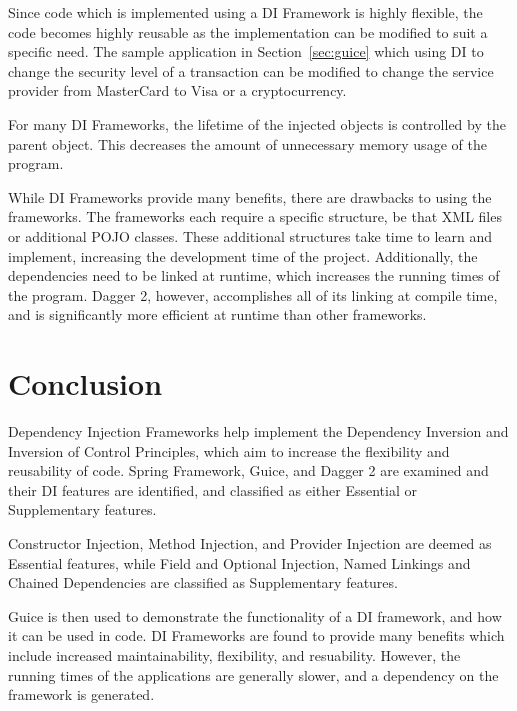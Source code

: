\documentclass[12pt,twocolumn]{IEEEtran}
\begin{document}
Since code which is implemented using a DI Framework is highly flexible, the code becomes highly reusable as the implementation can be modified to suit a specific need. The sample application in Section~\ref{sec:guice} which using DI to change the security level of a transaction can be modified to change the service provider from MasterCard to Visa or a cryptocurrency. 

For many DI Frameworks, the lifetime of the injected objects is controlled by the parent object. This decreases the amount of unnecessary memory usage of the program.

While DI Frameworks provide many benefits, there are drawbacks to using the frameworks. The frameworks each require a specific structure, be that XML files or additional POJO classes. These additional structures take time to learn and implement, increasing the development time of the project. Additionally, the dependencies need to be linked at runtime, which increases the running times of the program. Dagger 2, however, accomplishes all of its linking at compile time, and is significantly more efficient at runtime than other frameworks.


\section{Conclusion}

Dependency Injection Frameworks help implement the Dependency Inversion and Inversion of Control Principles, which aim to increase the flexibility and reusability of code. Spring Framework, Guice, and Dagger 2 are examined and their DI features are identified, and classified as either Essential or Supplementary features. 

Constructor Injection, Method Injection, and Provider Injection are deemed as Essential features, while Field and Optional Injection, Named Linkings and Chained Dependencies are classified as Supplementary features.

Guice is then used to demonstrate the functionality of a DI framework, and how it can be used in code. DI Frameworks are found to provide many benefits which include increased maintainability, flexibility, and resuability. However, the running times of the applications are generally slower, and a dependency on the framework is generated.





\clearpage
\onecolumn
\appendices
\renewcommand\thefigure{\thesection.\arabic{figure}} 
\renewcommand\theequation{\thesection.\arabic{equation}} 
\renewcommand\thetable{\thesection.\arabic{table}}
\renewcommand\thelstlisting{\thesection.\arabic{lstlisting}}
\end{document}
